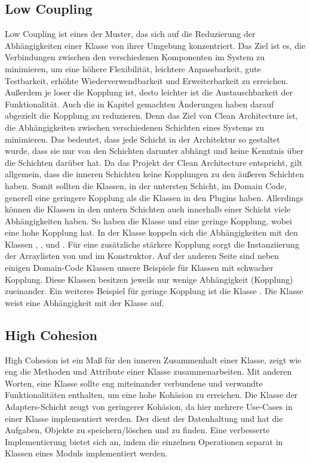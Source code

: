 \subsection{Low Coupling}
Low Coupling ist eines der Muster, das sich auf die Reduzierung der Abhängigkeiten einer Klasse von ihrer Umgebung konzentriert. Das Ziel ist es, die Verbindungen zwischen den verschiedenen Komponenten im System zu minimieren, um eine höhere Flexibilität, leichtere Anpassbarkeit, gute Testbarkeit, erhöhte Wiederverwendbarkeit und Erweiterbarkeit zu erreichen. Außerdem je loser die Kopplung ist, desto leichter ist die Austauschbarkeit der Funktionalität.
Auch die in Kapitel  gemachten Änderungen haben darauf abgezielt die Kopplung zu reduzieren. Denn das Ziel von Clean Architecture ist, die Abhängigkeiten zwischen verschiedenen Schichten eines Systems zu minimieren. Das bedeutet, dass jede Schicht in der Architektur so gestaltet wurde, dass sie nur von den Schichten darunter abhängt und keine Kenntnis über die Schichten darüber hat. Da das Projekt der Clean Architecture entspricht, gilt allgemein, dass die inneren Schichten keine Kopplungen zu den äußeren Schichten haben. 
Somit sollten die Klassen, in der untersten Schicht, im Domain Code, generell eine geringere Kopplung als die Klassen in den Plugins haben. Allerdings können die Klassen in den untern Schichten auch innerhalb einer Schicht viele Abhängigkeiten haben. So haben die Klasse  und  eine geringe Kopplung, wobei  eine hohe Kopplung hat.  
In der Klasse  koppeln sich die Abhängigkeiten mit den Klassen , ,  und . Für eine zusätzliche stärkere Kopplung sorgt die Instanziierung der Arraylisten von  und  im Konstruktor.
Auf der anderen Seite sind neben einigen Domain-Code Klassen unsere \href{https://github.com/MichaelaHaag/RezeptApp/blob/main/0-Plugins/src/main/java/de/rezeptapp/plugins/gui}{} Beispiele für Klassen mit schwacher Kopplung. Diese Klassen besitzen jeweils nur wenige Abhängigkeit (Kopplung) zueinander. 
Ein weiteres Beispiel für geringe Kopplung ist die Klasse . Die Klasse weist eine Abhängigkeit mit der Klasse  auf.

\subsection{High Cohesion}
High Cohesion  ist ein Maß für den inneren Zusammenhalt einer Klasse, zeigt wie eng die Methoden und Attribute einer Klasse zusammenarbeiten. Mit anderen Worten, eine Klasse sollte eng miteinander verbundene und verwandte Funktionalitäten enthalten, um eine hohe Kohäsion zu erreichen. 
Die Klasse  der Adapters-Schicht zeugt von geringerer Kohäsion, da hier mehrere Use-Cases in einer Klasse implementiert werden. Der  dient der Datenhaltung und hat die Aufgaben, Objekte zu speichern/löschen und zu finden. Eine verbesserte Implementierung bietet sich an, indem die einzelnen Operationen separat in Klassen eines Moduls implementiert werden.

